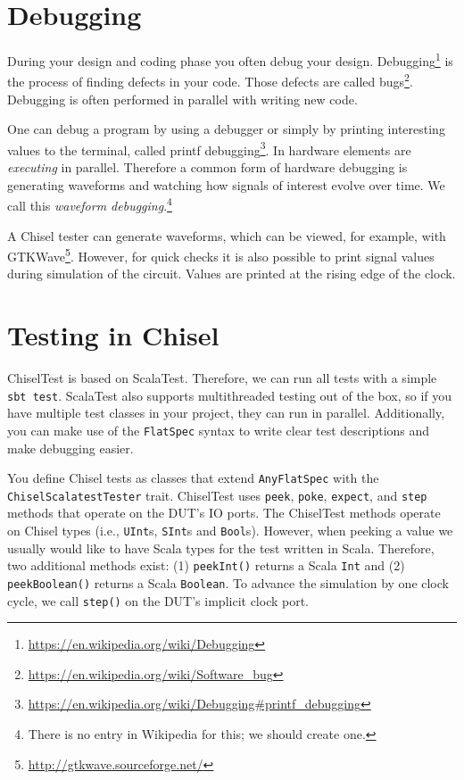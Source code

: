 \documentclass[%
    10pt,
    headinclude, footexclude,
    openright, %
    notitlepage,
    cleardoubleempty,
    headsepline,
    pointlessnumbers,
    bibtotoc, idxtotoc,
    ]{scrbook}
\newcommand{\code}[1]{{\small{\texttt{#1}}}}
\newcommand{\myref}[2]{\href{#1}{#2}}
\renewcommand{\myref}[2]{{#2}{\footnote{\url{#1}}}}
\begin{document}
\section{Debugging}

During your design and coding phase you often debug your design.
\myref{https://en.wikipedia.org/wiki/Debugging}{Debugging} is the process of
finding defects in your code. Those defects are called
\myref{https://en.wikipedia.org/wiki/Software_bug}{bugs}.
Debugging is often performed in parallel with writing new code.

One can debug a program by using a debugger or simply by printing interesting
values to the terminal, called \myref{https://en.wikipedia.org/wiki/Debugging\#printf\_debugging}{printf debugging}.
In hardware elements are \emph{executing} in parallel. Therefore a common form of hardware
debugging is generating waveforms and watching how signals of interest evolve over time.
We call this \emph{waveform debugging}.\footnote{There is no entry in Wikipedia for this;
we should create one.}

A Chisel tester can generate waveforms, which can be viewed, for example, with \myref{http://gtkwave.sourceforge.net/}{GTKWave}.
However, for quick checks it is also possible to print signal values during simulation of the circuit.
Values are printed at the rising edge of the clock.


\section{Testing in Chisel}

ChiselTest is based on ScalaTest. Therefore, we can run all tests with a simple \code{sbt test}.
ScalaTest also supports multithreaded testing out of the box, so if you have multiple
test classes in your project, they can run in parallel. Additionally, you can make use of
the \code{FlatSpec} syntax to write clear test descriptions and make debugging easier.

You define Chisel tests as classes that extend \code{AnyFlatSpec} with
the\\ \code{ChiselScalatestTester} trait. ChiselTest uses \code{peek},
\code{poke}, \code{expect}, and \code{step} methods that operate on the DUT's IO ports.
The ChiselTest methods operate on Chisel types (i.e., \code{UInt}s,
\code{SInt}s and \code{Bool}s). However, when peeking a value we
usually would like to have Scala types for the test written in Scala.
Therefore, two additional methods exist: (1) \code{peekInt()} returns a
Scala \code{Int} and (2) \code{peekBoolean()} returns a Scala \code{Boolean}.
To advance the simulation by one clock cycle,
we call \code{step()} on the DUT's implicit clock port.
\end{document}
